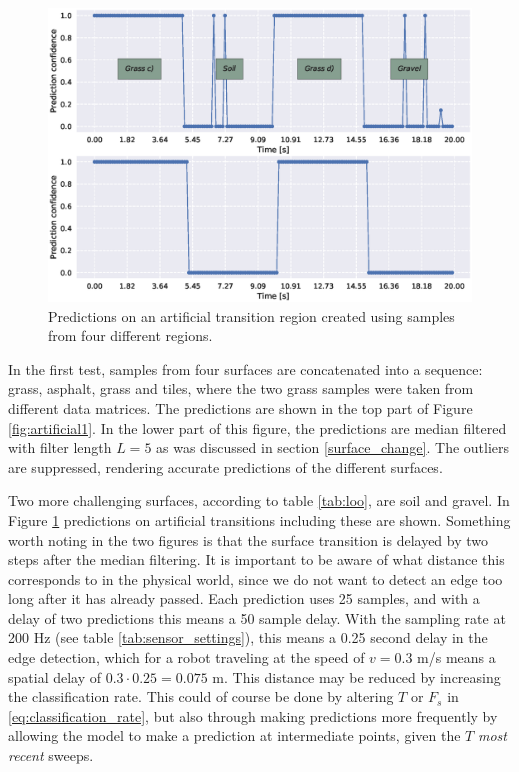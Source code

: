 \begin{figure}[t]
	\centering
	\includegraphics[scale=0.5]{figs_temp/varmats2}
	\caption{Predictions on an artificial transition region created using samples from four different regions.}
	\label{fig:artificial2}
\end{figure}

In the first test, samples from four surfaces are concatenated into a sequence: grass, asphalt, grass and tiles, where the two grass samples were taken from different data matrices. The predictions are shown in the top part of Figure \ref{fig:artificial1}. In the lower part of this figure, the predictions are median filtered with filter length $L=5$ as was discussed in section \ref{surface_change}. The outliers are suppressed, rendering accurate predictions of the different surfaces. 

Two more challenging surfaces, according to table \ref{tab:loo}, are soil and gravel. In Figure \ref{fig:artificial2} predictions on artificial transitions including these are shown. Something worth noting in the two figures is that the surface transition is delayed by two steps after the median filtering. It is important to be aware of what distance this corresponds to in the physical world, since we do not want to detect an edge too long after it has already passed. Each prediction uses 25 samples, and with a delay of two predictions this means a 50 sample delay. With the sampling rate at 200 Hz (see table \ref{tab:sensor_settings}), this means a 0.25 second delay in the edge detection, which for a robot traveling at the speed of $v=0.3$ m/s means a spatial delay of $0.3\cdot0.25=0.075$ m. This distance may be reduced by increasing the classification rate. This could of course be done by altering $T$ or $F_s$ in \eqref{eq:classification_rate}, but also through making predictions more frequently by allowing the model to make a prediction at intermediate points, given the $T$ \emph{most recent} sweeps.

